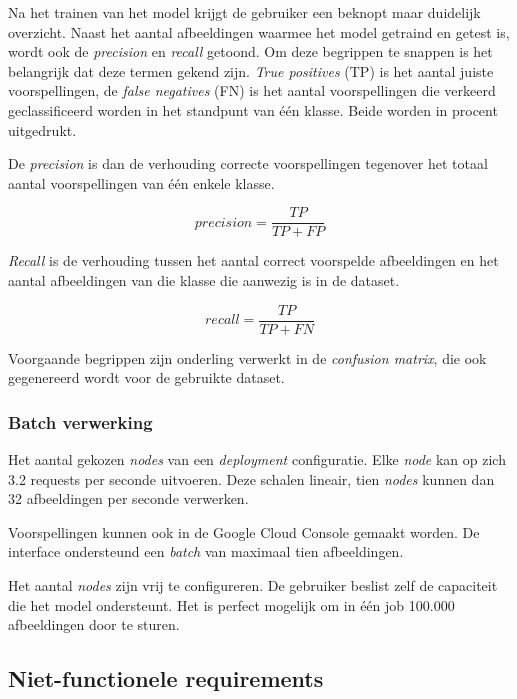 Na het trainen van het model krijgt de gebruiker een beknopt maar duidelijk overzicht. Naast het aantal afbeeldingen waarmee het model getraind en getest is, wordt ook de \textit{precision} en \textit{recall} getoond. Om deze begrippen te snappen is het belangrijk dat deze termen gekend zijn. \textit{True positives} (TP) is het aantal juiste voorspellingen, de \textit{false negatives} (FN) is het aantal voorspellingen die verkeerd geclassificeerd worden in het standpunt van één klasse. Beide worden in procent uitgedrukt.

De \textit{precision} is dan de verhouding correcte voorspellingen tegenover het totaal aantal voorspellingen van één enkele klasse.

\begin{equation}
    precision=\frac{TP}{TP+FP}
\end{equation}

\textit{Recall} is de verhouding tussen het aantal correct voorspelde afbeeldingen en het aantal afbeeldingen van die klasse die aanwezig is in de dataset.

\begin{equation}
    recall=\frac{TP}{TP+FN}
\end{equation}

Voorgaande begrippen zijn onderling verwerkt in de \textit{confusion matrix}, die ook gegenereerd wordt voor de gebruikte dataset.

\subsubsection{Batch verwerking}
\label{sucsubsec:google-fr-batch}

Het aantal gekozen \textit{nodes} van een \textit{deployment} configuratie. Elke \textit{node} kan op zich 3.2 requests per seconde uitvoeren. Deze schalen lineair, tien \textit{nodes} kunnen dan 32 afbeeldingen per seconde verwerken.

Voorspellingen kunnen ook in de Google Cloud Console gemaakt worden. De interface ondersteund een \textit{batch} van maximaal tien afbeeldingen. 

Het aantal \textit{nodes} zijn vrij te configureren. De gebruiker beslist zelf de capaciteit die het model ondersteunt. Het is perfect mogelijk om in één job 100.000 afbeeldingen door te sturen.

\subsection{Niet-functionele requirements}
\label{subsec:googlautoml-nfr} 

